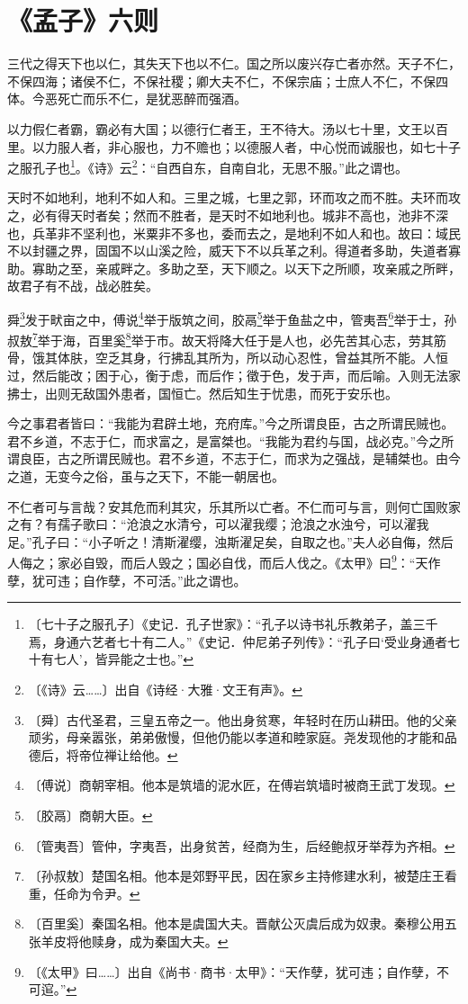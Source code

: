 \documentclass[12pt,UTF-8,openany,a4]{ctexbook}
\begin{document}
\chapter{《孟子》六则}

\begin{large}
    
    三代之得天下也以仁，其失天下也以不仁。国之所以废兴存亡者亦然。天子不仁，不保四海；诸侯不仁，不保社稷；卿大夫不仁，不保宗庙；士庶人不仁，不保四体。今恶死亡而乐不仁，是犹恶醉而强酒。
    
    以力假仁者霸，霸必有大国；以德行仁者王，王不待大。汤以七十里，文王以百里。以力服人者，非心服也，力不赡也；以德服人者，中心悦而诚服也，如七十子之服孔子也\footnote{〔七十子之服孔子〕\yiwen 《史记．孔子世家》：“孔子以诗书礼乐教弟子，盖三千焉，身通六艺者七十有二人。”《史记．仲尼弟子列传》：“孔子曰‘受业身通者七十有七人’，皆异能之士也。”}。《诗》云\footnote{〔《诗》云……〕\yiwen 出自《诗经·大雅·文王有声》。}：“自西自东，自南自北，无思不服。”此之谓也。
    
    天时不如地利，地利不如人和。三里之城，七里之郭，环而攻之而不胜。夫环而攻之，必有得天时者矣；然而不胜者，是天时不如地利也。城非不高也，池非不深也，兵革非不坚利也，米粟非不多也，委而去之，是地利不如人和也。故曰：域民不以封疆之界，固国不以山溪之险，威天下不以兵革之利。得道者多助，失道者寡助。寡助之至，亲戚畔之。多助之至，天下顺之。以天下之所顺，攻亲戚之所畔，故君子有不战，战必胜矣。
    
    舜\footnote{〔舜〕\yiwen 古代圣君，三皇五帝之一。他出身贫寒，年轻时在历山耕田。他的父亲顽劣，母亲嚣张，弟弟傲慢，但他仍能以孝道和睦家庭。尧发现他的才能和品德后，将帝位禅让给他。}发于畎亩之中，傅说\footnote{〔傅说〕\yiwen 商朝宰相。他本是筑墙的泥水匠，在傅岩筑墙时被商王武丁发现。}举于版筑之间，胶鬲\footnote{〔胶鬲〕\yiwen 商朝大臣。}举于鱼盐之中，管夷吾\footnote{〔管夷吾〕\yiwen 管仲，字夷吾，出身贫苦，经商为生，后经鲍叔牙举荐为齐相。}举于士，孙叔敖\footnote{〔孙叔敖〕\yiwen 楚国名相。他本是郊野平民，因在家乡主持修建水利，被楚庄王看重，任命为令尹。}举于海，百里奚\footnote{〔百里奚〕\yiwen 秦国名相。他本是虞国大夫。晋献公灭虞后成为奴隶。秦穆公用五张羊皮将他赎身，成为秦国大夫。}举于市。故天将降大任于是人也，必先苦其心志，劳其筋骨，饿其体肤，空乏其身，行拂乱其所为，所以动心忍性，曾益其所不能。人恒过，然后能改；困于心，衡于虑，而后作；徵于色，发于声，而后喻。入则无法家拂士，出则无敌国外患者，国恒亡。然后知生于忧患，而死于安乐也。
    
    今之事君者皆曰：“我能为君辟土地，充府库。”今之所谓良臣，古之所谓民贼也。君不乡道，不志于仁，而求富之，是富桀也。“我能为君约与国，战必克。”今之所谓良臣，古之所谓民贼也。君不乡道，不志于仁，而求为之强战，是辅桀也。由今之道，无变今之俗，虽与之天下，不能一朝居也。
    
    不仁者可与言哉？安其危而利其灾，乐其所以亡者。不仁而可与言，则何亡国败家之有？有孺子歌曰：“沧浪之水清兮，可以濯我缨；沧浪之水浊兮，可以濯我足。”孔子曰：“小子听之！清斯濯缨，浊斯濯足矣，自取之也。”夫人必自侮，然后人侮之；家必自毁，而后人毁之；国必自伐，而后人伐之。《太甲》曰\footnote{〔《太甲》曰……〕\yiwen 出自《尚书·商书·太甲》：“天作孽，犹可违；自作孽，不可逭。”}：“天作孽，犹可违；自作孽，不可活。”此之谓也。

\end{large}
\end{document}
